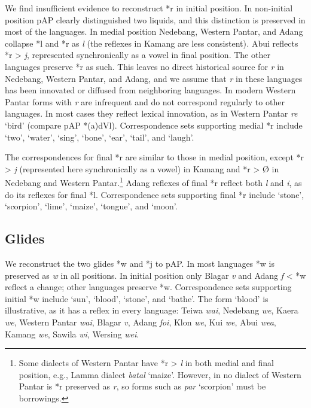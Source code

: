 We find insufficient evidence to reconstruct *r in initial position. In non-initial position pAP clearly distinguished two liquids, and this distinction is preserved in most of the languages. In medial position Nedebang, Western Pantar, and Adang collapse *l and *r as \textit{l }(the reflexes in Kamang are less consistent)\textit{. }Abui reflects *r {\textgreater} \textit{j}, represented synchronically as a vowel in final position. The other languages preserve *r as such. This leaves no direct historical source for \textit{r} in Nedebang, Western Pantar, and Adang, and we assume that \textit{r }in these languages has been innovated or diffused from neighboring languages. In modern Western Pantar forms with \textit{r} are infrequent and do not correspond regularly to other languages. In most cases they reflect lexical innovation, as in Western Pantar \textit{re }`bird' (compare pAP *(a)dVl). Correspondence sets supporting medial *r include `two', `water', `sing', `bone', `ear', `tail', and `laugh'. 

 The correspondences for final *r are similar to those in medial position, except *r {\textgreater} \textit{j} (represented here synchronically as a vowel) in Kamang and *r {\textgreater} {\O} in Nedebang and Western Pantar.\footnote{ Some dialects of Western Pantar have *r {\textgreater} \textit{l} in both medial and final position, e.g., Lamma dialect \textit{bat{\textlengthmark}al }`maize'. However, in no dialect of Western Pantar is *r preserved as \textit{r}, so forms such as \textit{par} `scorpion' must be borrowings.} Adang reflexes of final *r reflect both \textit{l} and \textit{i}, as do its reflexes for final *l. Correspondence sets supporting final *r include `stone', `scorpion', `lime', `maize', `tongue', and `moon'. 

\subsection{ Glides}
We reconstruct the two glides *w and *j to pAP. In most languages *w is preserved as \textit{w} in all positions. In initial position only Blagar \textit{v} and Adang \textit{f} {\textless} *w reflect a change; other languages preserve *w. Correspondence sets supporting initial *w include `sun', `blood', `stone', and `bathe'. The form `blood' is illustrative, as it has a reflex in every language: Teiwa \textit{wai}, Nedebang \textit{we}, Kaera \textit{we}, Western Pantar \textit{wai}, Blagar \textit{v{\textepsilon}}, Adang \textit{foi}, Klon \textit{we{\textglotstop}}, Kui \textit{we}, Abui \textit{wea}, Kamang \textit{we{\textlengthmark}}, Sawila \textit{wi{\textlengthmark}}, Wersing \textit{wei}.

